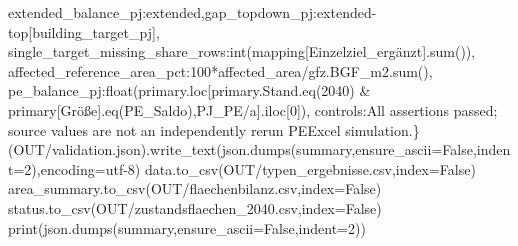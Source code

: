 \documentclass[
  ngerman,
  a4paper,
  DIV=11]{scrreprt}
\newenvironment{Shaded}{\begin{snugshade}}{\end{snugshade}}
\newcommand{\BuiltInTok}[1]{\textcolor[rgb]{0.00,0.23,0.31}{#1}}
\newcommand{\DecValTok}[1]{\textcolor[rgb]{0.68,0.00,0.00}{#1}}
\newcommand{\NormalTok}[1]{\textcolor[rgb]{0.00,0.23,0.31}{#1}}
\newcommand{\OperatorTok}[1]{\textcolor[rgb]{0.37,0.37,0.37}{#1}}
\newcommand{\StringTok}[1]{\textcolor[rgb]{0.13,0.47,0.30}{#1}}
\newcommand{\VariableTok}[1]{\textcolor[rgb]{0.07,0.07,0.07}{#1}}
\begin{document}
\begin{Shaded}
\begin{Highlighting}[]
 \StringTok{\textquotesingle{}extended\_balance\_pj\textquotesingle{}}\NormalTok{:extended,}\StringTok{\textquotesingle{}gap\_topdown\_pj\textquotesingle{}}\NormalTok{:extended}\OperatorTok{{-}}\NormalTok{top[}\StringTok{\textquotesingle{}building\_target\_pj\textquotesingle{}}\NormalTok{],}
 \StringTok{\textquotesingle{}single\_target\_missing\_share\_rows\textquotesingle{}}\NormalTok{:}\BuiltInTok{int}\NormalTok{(mapping[}\StringTok{\textquotesingle{}Einzelziel\_ergänzt\textquotesingle{}}\NormalTok{].}\BuiltInTok{sum}\NormalTok{()),}
 \StringTok{\textquotesingle{}affected\_reference\_area\_pct\textquotesingle{}}\NormalTok{:}\DecValTok{100}\OperatorTok{*}\NormalTok{affected\_area}\OperatorTok{/}\NormalTok{gfz.BGF\_m2.}\BuiltInTok{sum}\NormalTok{(),}
 \StringTok{\textquotesingle{}pe\_balance\_pj\textquotesingle{}}\NormalTok{:}\BuiltInTok{float}\NormalTok{(primary.loc[primary.Stand.eq(}\StringTok{\textquotesingle{}2040\textquotesingle{}}\NormalTok{) }\OperatorTok{\&}\NormalTok{ primary[}\StringTok{\textquotesingle{}Größe\textquotesingle{}}\NormalTok{].eq(}\StringTok{\textquotesingle{}PE\_Saldo\textquotesingle{}}\NormalTok{),}\StringTok{\textquotesingle{}PJ\_PE/a\textquotesingle{}}\NormalTok{].iloc[}\DecValTok{0}\NormalTok{]),}
 \StringTok{\textquotesingle{}controls\textquotesingle{}}\NormalTok{:}\StringTok{\textquotesingle{}All assertions passed; source values are not an independently rerun PEExcel simulation.\textquotesingle{}}\NormalTok{\}}
\NormalTok{(OUT}\OperatorTok{/}\StringTok{\textquotesingle{}validation.json\textquotesingle{}}\NormalTok{).write\_text(json.dumps(summary,ensure\_ascii}\OperatorTok{=}\VariableTok{False}\NormalTok{,indent}\OperatorTok{=}\DecValTok{2}\NormalTok{),encoding}\OperatorTok{=}\StringTok{\textquotesingle{}utf{-}8\textquotesingle{}}\NormalTok{)}
\NormalTok{data.to\_csv(OUT}\OperatorTok{/}\StringTok{\textquotesingle{}typen\_ergebnisse.csv\textquotesingle{}}\NormalTok{,index}\OperatorTok{=}\VariableTok{False}\NormalTok{)}
\NormalTok{area\_summary.to\_csv(OUT}\OperatorTok{/}\StringTok{\textquotesingle{}flaechenbilanz.csv\textquotesingle{}}\NormalTok{,index}\OperatorTok{=}\VariableTok{False}\NormalTok{)}
\NormalTok{status.to\_csv(OUT}\OperatorTok{/}\StringTok{\textquotesingle{}zustandsflaechen\_2040.csv\textquotesingle{}}\NormalTok{,index}\OperatorTok{=}\VariableTok{False}\NormalTok{)}
\BuiltInTok{print}\NormalTok{(json.dumps(summary,ensure\_ascii}\OperatorTok{=}\VariableTok{False}\NormalTok{,indent}\OperatorTok{=}\DecValTok{2}\NormalTok{))}
\end{Highlighting}
\end{Shaded}
\end{document}
